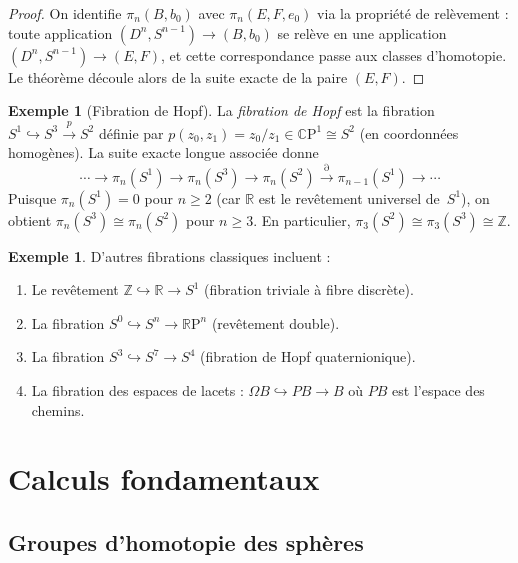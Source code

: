 \documentclass[12pt,a4paper,openany]{book}
\theoremstyle{definition}
\newtheorem{exemple}[definition]{Exemple}
\theoremstyle{plain}
\theoremstyle{remark}
\newcommand{\Z}{\mathbb{Z}}
\newcommand{\R}{\mathbb{R}}
\newcommand{\RP}{\mathbb{R}\mathrm{P}}
\newcommand{\CP}{\mathbb{C}\mathrm{P}}
\begin{document}
\begin{proof}
  On identifie $\pi_n(B, b_0)$ avec $\pi_n(E, F, e_0)$ via la propriété de
  relèvement : toute application $(D^n, S^{n-1}) \to (B, b_0)$ se relève en une
  application $(D^n, S^{n-1}) \to (E, F)$, et cette correspondance passe aux classes
  d'homotopie. Le théorème découle alors de la suite exacte de la paire $(E, F)$.
\end{proof}

\begin{exemple}[Fibration de Hopf]\label{ex:hopf}
  La \emph{fibration de Hopf} est la fibration $S^1 \hookrightarrow S^3 \xrightarrow{p} S^2$
  définie par $p(z_0, z_1) = z_0/z_1 \in \CP^1 \cong S^2$ (en coordonnées
  homogènes). La suite exacte longue associée donne
  \[
    \cdots \to \pi_n(S^1) \to \pi_n(S^3) \to \pi_n(S^2) \xrightarrow{\partial}
    \pi_{n-1}(S^1) \to \cdots
  \]
  Puisque $\pi_n(S^1) = 0$ pour $n \geq 2$ (car $\R$ est le revêtement universel
  de~$S^1$), on obtient $\pi_n(S^3) \cong \pi_n(S^2)$ pour $n \geq 3$.
  En particulier, $\pi_3(S^2) \cong \pi_3(S^3) \cong \Z$.
\end{exemple}

\begin{exemple}\label{ex:fibrations-classiques}
  D'autres fibrations classiques incluent :
  \begin{enumerate}[label=(\roman*)]
    \item Le revêtement $\Z \hookrightarrow \R \to S^1$ (fibration triviale à fibre
          discrète).
    \item La fibration $S^0 \hookrightarrow S^n \to \RP^n$ (revêtement double).
    \item La fibration $S^3 \hookrightarrow S^7 \to S^4$ (fibration de Hopf
          quaternionique).
    \item La fibration des espaces de lacets :
          $\Omega B \hookrightarrow PB \to B$ où $PB$ est l'espace des chemins.
  \end{enumerate}
\end{exemple}


\section{Calculs fondamentaux}\label{sec:calculs-pi-n}

\subsection{Groupes d'homotopie des sphères}\label{subsec:homotopie-spheres}
\end{document}
